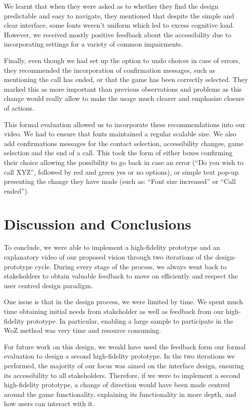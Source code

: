 \documentclass[12pt,a4paper]{article}
\begin{document}
We learnt that when they were asked as to whether they find the design predictable and easy to navigate, they mentioned that despite the simple and clear interface, some fonts weren't uniform which led to excess cognitive load. However, we received mostly positive feedback about the accessibility due to incorporating settings for a variety of common impairments.  

Finally, even though we had set up the option to undo choices in case of errors, they recommended the incorporation of confirmation messages, such as mentioning the call has ended, or that the game has been correctly selected. They marked this as more important than previous observations and problems as this change would really allow to make the usage much clearer and emphasize closure of actions.  

This formal evaluation allowed us to incorporate these recommendations into our video. We had to ensure that fonts maintained a regular scalable size. We also add confirmations messages for the contact selection, accessibility changes, game selection and the end of a call. This took the form of either boxes confirming their choice allowing the possibility to go back in case an error (“Do you wish to call XYZ”, followed by red and green yes or no options), or simple text pop-up presenting the change they have made (such as: “Font size increased” or “Call ended”).  

\section{Discussion and Conclusions}

To conclude, we were able to implement a high-fidelity prototype and an explanatory video of our proposed vision through two iterations of the design-prototype cycle. During every stage of the process, we always went back to stakeholders to obtain valuable feedback to move on efficiently and respect the user centred design paradigm. 

One issue is that in the design process, we were limited by time. We spent much time obtaining initial needs from stakeholder as well as feedback from our high-fidelity prototype. In particular, enabling a large sample to participate in the WoZ method was very time and resource consuming.  

For future work on this design, we would have used the feedback form our formal evaluation to design a second high-fidelity prototype. In the two iterations we performed, the majority of our focus was aimed on the interface design, ensuring its accessibility to all stakeholders. Therefore, if we were to implement a second high-fidelity prototype, a change of direction would have been made centred around the game functionality, explaining its functionality in more depth, and how users can interact with it.  
\end{document}

